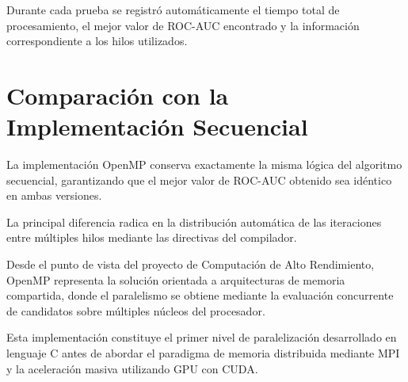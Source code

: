 Durante cada prueba se registró automáticamente el tiempo total de procesamiento, el mejor valor de ROC-AUC encontrado y la información correspondiente a los hilos utilizados.



\section{Comparación con la Implementación Secuencial}

La implementación OpenMP conserva exactamente la misma lógica del algoritmo secuencial, garantizando que el mejor valor de ROC-AUC obtenido sea idéntico en ambas versiones.

La principal diferencia radica en la distribución automática de las iteraciones entre múltiples hilos mediante las directivas del compilador.

Desde el punto de vista del proyecto de Computación de Alto Rendimiento, OpenMP representa la solución orientada a arquitecturas de memoria compartida, donde el paralelismo se obtiene mediante la evaluación concurrente de candidatos sobre múltiples núcleos del procesador.

Esta implementación constituye el primer nivel de paralelización desarrollado en lenguaje C antes de abordar el paradigma de memoria distribuida mediante MPI y la aceleración masiva utilizando GPU con CUDA.